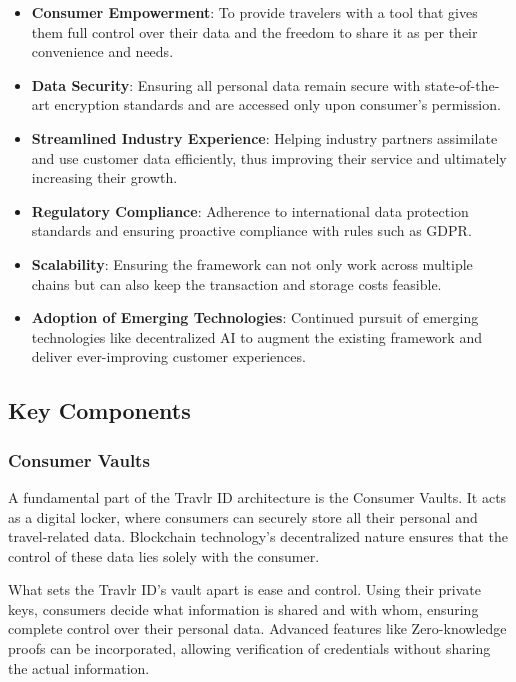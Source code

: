 \documentclass{article}
\begin{document}
\begin{itemize}
    \item \textbf{Consumer Empowerment}: To provide travelers with a tool that gives them full control over their data and the freedom to share it as per their convenience and needs.
    \item \textbf{Data Security}: Ensuring all personal data remain secure with state-of-the-art encryption standards and are accessed only upon consumer's permission.
    \item \textbf{Streamlined Industry Experience}: Helping industry partners assimilate and use customer data efficiently, thus improving their service and ultimately increasing their growth.
    \item \textbf{Regulatory Compliance}: Adherence to international data protection standards and ensuring proactive compliance with rules such as GDPR.
    \item \textbf{Scalability}: Ensuring the framework can not only work across multiple chains but can also keep the transaction and storage costs feasible.
    \item \textbf{Adoption of Emerging Technologies}: Continued pursuit of emerging technologies like decentralized AI to augment the existing framework and deliver ever-improving customer experiences.
\end{itemize}

\subsection{Key Components}

\subsubsection{Consumer Vaults}

A fundamental part of the Travlr ID architecture is the Consumer Vaults. It acts as a digital locker, where consumers can securely store all their personal and travel-related data. Blockchain technology's decentralized nature ensures that the control of these data lies solely with the consumer.

What sets the Travlr ID’s vault apart is ease and control. Using their private keys, consumers decide what information is shared and with whom, ensuring complete control over their personal data. Advanced features like Zero-knowledge proofs can be incorporated, allowing verification of credentials without sharing the actual information.
\end{document}
